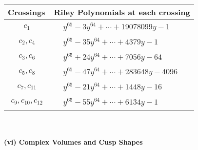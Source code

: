 \documentclass[1p]{elsarticle_modified}
\theoremstyle{definition}
\begin{document}
\begin{tabular}{m{50pt}|m{274pt}}
Crossings & \hspace{64pt}Riley Polynomials at each crossing \\
\hline $$\begin{aligned}c_{1}\end{aligned}$$&$\begin{aligned}
&y^{65}-3 y^{64}+\cdots+19078099 y-1
\end{aligned}$\\
\hline $$\begin{aligned}c_{2},c_{4}\end{aligned}$$&$\begin{aligned}
&y^{65}-35 y^{64}+\cdots+4379 y-1
\end{aligned}$\\
\hline $$\begin{aligned}c_{3},c_{6}\end{aligned}$$&$\begin{aligned}
&y^{65}+24 y^{64}+\cdots+7056 y-64
\end{aligned}$\\
\hline $$\begin{aligned}c_{5},c_{8}\end{aligned}$$&$\begin{aligned}
&y^{65}-47 y^{64}+\cdots+283648 y-4096
\end{aligned}$\\
\hline $$\begin{aligned}c_{7},c_{11}\end{aligned}$$&$\begin{aligned}
&y^{65}-21 y^{64}+\cdots+1448 y-16
\end{aligned}$\\
\hline $$\begin{aligned}c_{9},c_{10},c_{12}\end{aligned}$$&$\begin{aligned}
&y^{65}-55 y^{64}+\cdots+6134 y-1
\end{aligned}$\\
\hline
\end{tabular}\\~\\
\newpage\flushleft \textbf{(vi) Complex Volumes and Cusp Shapes}
\end{document}
